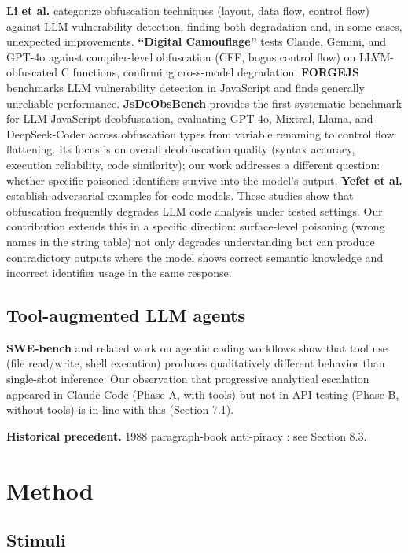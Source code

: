 \documentclass[11pt]{article}
\begin{document}
\textbf{Li et al.} \cite{li2025} categorize obfuscation techniques (layout, data
flow, control flow) against LLM vulnerability detection, finding
both degradation and, in some cases, unexpected improvements.
\textbf{``Digital Camouflage''} \cite{digitalcamo} tests Claude, Gemini, and GPT-4o
against compiler-level obfuscation (CFF, bogus control flow) on
LLVM-obfuscated C functions, confirming cross-model degradation.
\textbf{FORGEJS} \cite{forgejs} benchmarks LLM vulnerability detection in JavaScript
and finds generally unreliable performance. \textbf{JsDeObsBench} \cite{jsdeobsbench}
provides the first systematic benchmark for LLM JavaScript
deobfuscation, evaluating GPT-4o, Mixtral, Llama, and DeepSeek-Coder
across obfuscation types from variable renaming to control flow
flattening. Its focus is on overall deobfuscation quality (syntax
accuracy, execution reliability, code similarity); our work addresses
a different question: whether specific poisoned identifiers survive
into the model's output. \textbf{Yefet et al.} \cite{yefet2020}
establish adversarial examples for code models. These studies show that obfuscation frequently degrades LLM code
analysis under tested settings. Our contribution extends this in a
specific direction: surface-level
poisoning (wrong names in the string table) not only degrades
understanding but can produce contradictory outputs where the
model shows correct semantic knowledge and incorrect identifier
usage in the same response.

\subsection{Tool-augmented LLM agents}

\textbf{SWE-bench} \cite{swebench} and related work on agentic coding workflows show
that tool use (file read/write, shell execution) produces qualitatively
different behavior than single-shot inference. Our observation that
progressive analytical escalation appeared in Claude Code (Phase A,
with tools) but not in API testing (Phase B, without tools) is
in line with this (Section 7.1).

\textbf{Historical precedent.} 1988 paragraph-book anti-piracy \cite{sentinel1988,wasteland2016}:
see Section 8.3.

\section{Method}

\subsection{Stimuli}
\end{document}
